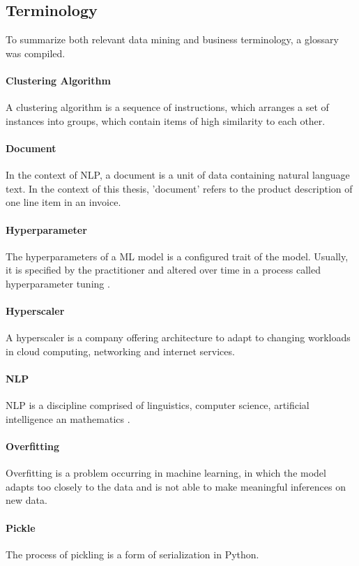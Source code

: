\subsection{Terminology}
To summarize both relevant data mining and business terminology, a glossary was compiled.

	\paragraph{Clustering Algorithm} A clustering algorithm is a sequence of instructions, which arranges a set of instances into groups, which contain items of high similarity to each other.
	\paragraph{Document} In the context of \ac{NLP}, a document is a unit of data containing natural language text. In the context of this thesis, 'document' refers to the product description of one line item in an invoice.
	\paragraph{Hyperparameter} The hyperparameters of a \ac{ML} model is a configured trait of the model. Usually, it is specified by the practitioner and altered over time in a process called hyperparameter tuning \cite{hyperparameter}.
	\paragraph{Hyperscaler} A hyperscaler is a company offering architecture to adapt to changing workloads in cloud computing, networking and internet services.
	\paragraph{\acf{NLP}} \ac{NLP} is a discipline comprised of linguistics, computer science, artificial intelligence an mathematics \cite[p.~51]{chowdhury2003}.
	\paragraph{Overfitting} Overfitting is a problem occurring in machine learning, in which the model adapts too closely to the data and is not able to make meaningful inferences on new data.
	\paragraph{Pickle} The process of pickling is a form of serialization in Python.
